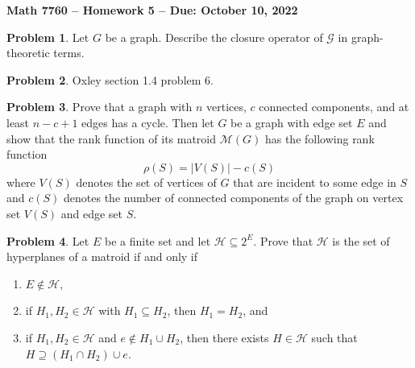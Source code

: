 \documentclass[letterpaper,11pt]{amsart}
\theoremstyle{plain}
\theoremstyle{definition}
\newtheorem{pr}{Problem}
\theoremstyle{remark}
\begin{document}
\Large

\begin{center}
{\bf Math 7760 -- Homework  5 --  Due:  October 10, 2022}
\end{center}

\normalsize


\bigskip


\bigskip

\begin{pr}
    Let $G$ be a graph. Describe the closure operator of $\mathcal{G}$ in graph-theoretic terms.
\end{pr}

\begin{pr}
    Oxley section 1.4 problem 6.
\end{pr}

\bigskip

\bigskip

\begin{pr}
    Prove that a graph with $n$ vertices, $c$ connected components, and at least $n - c + 1$ edges has a cycle.
    Then let $G$ be a graph with edge set $E$ and show that the rank function of its matroid $\mathcal{M}(G)$
    has the following rank function
    \[
        \rho(S) = |V(S)| - c(S)
    \]
    where $V(S)$ denotes the set of vertices of $G$ that are incident to some edge in $S$ and $c(S)$ denotes the number of connected components of the graph on vertex set $V(S)$ and edge set $S$.
\end{pr}

\begin{pr}
    Let $E$ be a finite set and let $\mathcal{H} \subseteq 2^E$.
    Prove that $\mathcal{H}$ is the set of hyperplanes of a matroid if and only if
    \begin{enumerate}
        \item $E \notin \mathcal{H}$,
        \item if $H_1,H_2 \in \mathcal{H}$ with $H_1 \subseteq H_2$, then $H_1 = H_2$, and
        \item if $H_1,H_2 \in \mathcal{H}$ and $e \notin H_1 \cup H_2$, then there exists $H \in \mathcal{H}$
        such that $H \supseteq (H_1 \cap H_2) \cup e$.
    \end{enumerate}
\end{pr}

\bigskip
\end{document}
